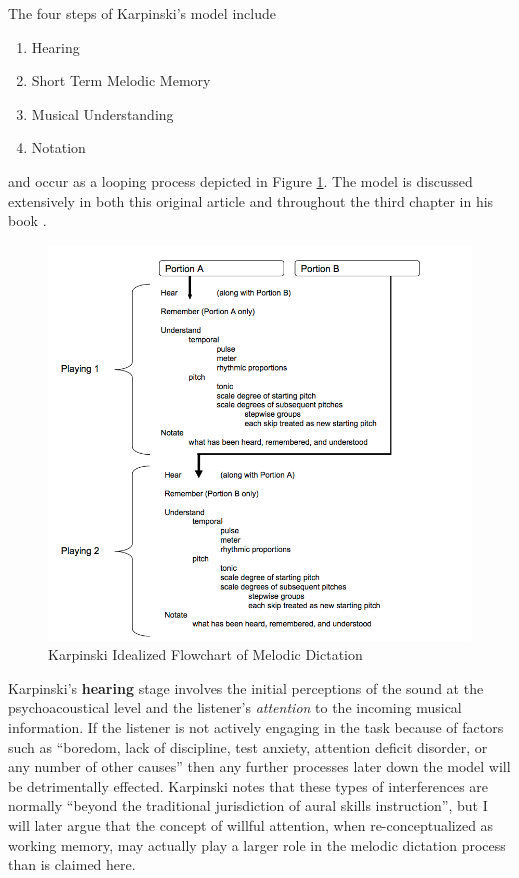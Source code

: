 \documentclass[]{book}
\providecommand{\tightlist}{%
  \setlength{\itemsep}{0pt}\setlength{\parskip}{0pt}}
\theoremstyle{definition}
\theoremstyle{definition}
\theoremstyle{definition}
\theoremstyle{remark}
\begin{document}
The four steps of Karpinski's model include

\begin{enumerate}
\def\labelenumi{\arabic{enumi}.}
\tightlist
\item
  Hearing
\item
  Short Term Melodic Memory
\item
  Musical Understanding
\item
  Notation
\end{enumerate}

and occur as a looping process depicted in Figure \ref{fig:flowchart}.
The model is discussed extensively in both this original article
\citep{karpinskiModelMusicPerception1990} and throughout the third
chapter in his book \citep{karpinskiAuralSkillsAcquisition2000}.

\begin{figure}

{\centering \includegraphics[width=1\linewidth]{img/karpinski31} 

}

\caption{Karpinski Idealized Flowchart of Melodic Dictation}\label{fig:flowchart}
\end{figure}

Karpinski's \textbf{hearing} stage involves the initial perceptions of
the sound at the psychoacoustical level and the listener's
\emph{attention} to the incoming musical information. If the listener is
not actively engaging in the task because of factors such as ``boredom,
lack of discipline, test anxiety, attention deficit disorder, or any
number of other causes'' then any further processes later down the model
will be detrimentally effected. Karpinski notes that these types of
interferences are normally ``beyond the traditional jurisdiction of
aural skills instruction'', but I will later argue that the concept of
willful attention, when re-conceptualized as working memory, may
actually play a larger role in the melodic dictation process than is
claimed here.
\end{document}
